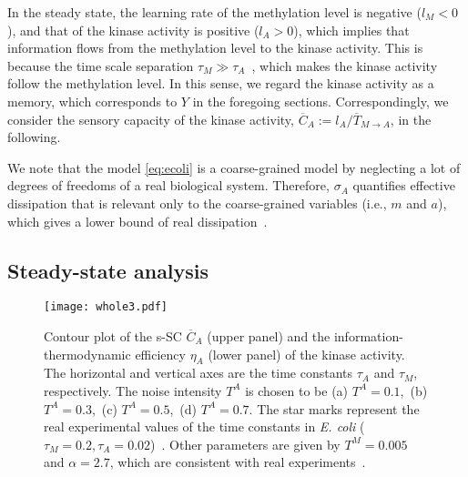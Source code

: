 \documentclass[%
 reprint,
 amsmath,amssymb,
 aps,
]{revtex4-1}
\theoremstyle{plain}
\begin{document}
In the steady state, the learning rate of the methylation level is negative ($l_M<0$), and that of the kinase activity is positive ($l_A>0$), which implies that information flows from the methylation level to the kinase activity. This is because  the time scale separation $\tau_M \gg \tau_A$~\cite{Lan2016}, which makes the kinase activity follow the methylation level. In this sense, we regard the kinase activity as a memory, which corresponds to $Y$ in the foregoing sections. Correspondingly, we consider the sensory capacity of the kinase activity, $\overline{C}_A := l_A / \overline{T}_{M \to A}$, in the following. 

We note that the model \eqref{eq:ecoli} is a coarse-grained model by neglecting a lot of degrees of freedoms of a real biological system. Therefore, $\sigma_A$ quantifies effective dissipation that is relevant only to the coarse-grained variables (i.e., $m$ and $a$), which gives a lower bound of real dissipation~\cite{Kawaguchi2013}.

\subsection{Steady-state analysis}

\begin{figure*}[htbp]
\texttt{[image: whole3.pdf]}
\caption{\label{fig:capy}Contour plot of the s-SC $\overline{C}_A$ (upper panel) and the information-thermodynamic efficiency $\eta_A$ (lower panel) of the kinase activity. The horizontal and vertical axes are the time constants $\tau_A$ and $\tau_M$, respectively. The noise intensity $T^A$ is chosen to be (a) $T^A=0.1$,\ (b) $T^A=0.3$,\ (c) $T^A=0.5$,\ (d) $T^A=0.7$. The star marks represent the real experimental values of the time constants in {\it E. coli} ($\tau_M=0.2, \tau_A=0.02$)~\cite{Tu2008,Emonet2008,Tostevin2009,Lan2012}. Other parameters are given by $T^M=0.005$ and $\alpha=2.7$, which are consistent with real experiments~\cite{Tu2008,Emonet2008,Tostevin2009,Lan2012}.}
\end{figure*}
\end{document}
